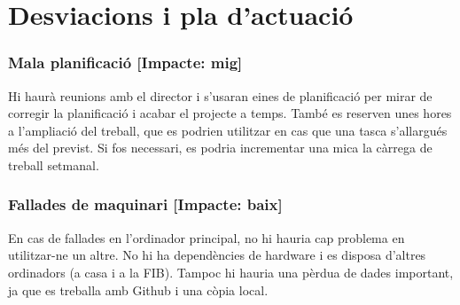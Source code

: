 \section{Desviacions i pla d'actuació}
	\subsubsection{Mala planificació [Impacte: mig]}
		Hi haurà reunions amb el director i s'usaran eines de planificació per mirar de corregir la planificació i acabar el projecte a temps. També es reserven unes hores a l'ampliació del treball,
		que es podrien utilitzar en cas que una tasca s'allargués més del previst. Si fos necessari, es podria incrementar una mica la càrrega de treball setmanal.
	\subsubsection{Fallades de maquinari [Impacte: baix]}
		En cas de fallades en l'ordinador principal, no hi hauria cap problema en utilitzar-ne un altre. No hi ha dependències de hardware i es disposa d'altres ordinadors (a casa i a la FIB).
		Tampoc hi hauria una pèrdua de dades important, ja que es treballa amb Github i una còpia local.
